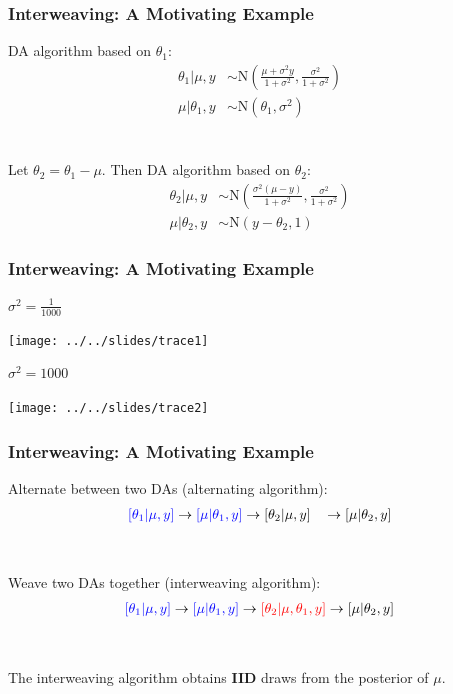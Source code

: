\documentclass[xcolor=dvipsnames]{beamer}
\newcommand\N{\mathrm{N}}
\begin{document}
\begin{frame}
\frametitle{Interweaving: A Motivating Example}

DA algorithm based on $\theta_1$:
\begin{align*}
\theta_1|\mu,y &\sim \N\left(\frac{\mu + \sigma^2y}{1+\sigma^2}, \frac{\sigma^2}{1+\sigma^2}\right)\\
\mu |\theta_1, y &\sim \N(\theta_1, \sigma^2)
\end{align*}\\~\\

\pause Let $\theta_2 = \theta_1 - \mu$. Then DA algorithm based on $\theta_2$:
\begin{align*}
\theta_2|\mu,y &\sim \N\left(\frac{\sigma^2(\mu - y)}{1+\sigma^2}, \frac{\sigma^2}{1+\sigma^2}\right)\\
\mu |\theta_2, y &\sim \N(y-\theta_2, 1)
\end{align*}
\end{frame}

\begin{frame}
\frametitle{Interweaving: A Motivating Example}
$\sigma^2=\frac{1}{1000}$
\begin{center}
\texttt{[image: ../../slides/trace1]}\\
\end{center}
$\sigma^2=1000$
\begin{center}
\texttt{[image: ../../slides/trace2]}
\end{center}
\end{frame}

\begin{frame}
\frametitle{Interweaving: A Motivating Example}
Alternate between two DAs (alternating algorithm):
\begin{align*}
{\color{blue}[\theta_1|\mu,y]} \to {\color{blue}[\mu|\theta_1,y]} \to [\theta_2|\mu,y]\phantom{\theta_1} \to [\mu|\theta_2,y]
\end{align*}\\~\\
\pause Weave two DAs together (interweaving algorithm):
\begin{align*}
{\color{blue}[\theta_1|\mu,y]} \to {\color{blue}[\mu|\theta_1,y]} \to {\color{red}[\theta_2|\mu,\theta_1,y]} \to [\mu|\theta_2,y]
\end{align*}\\~\\\pause
The interweaving algorithm obtains {\bf IID} draws from the posterior of $\mu$.
\end{frame}
\end{document}
